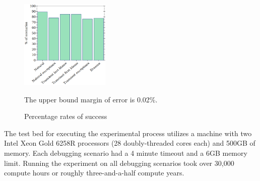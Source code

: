 
\begin{figure} \footnotesize
  \vspace{-1.5em}
  \includegraphics[width=0.38\textwidth]{./plots/success-bars}
  \vspace{1em}
  \begin{minipage}{0.35\textwidth} \raggedright
   The upper bound margin of error is 0.02\%.
  \end{minipage}
\vspace{-2em}
  \caption{Percentage rates of success} \label{fig:success-bars}
\end{figure}


The test bed for executing the experimental process utilizes a machine with two
Intel Xeon Gold 6258R processors (28 doubly-threaded cores each) and 500GB of
memory.  Each debugging scenario had a 4 minute timeout and a 6GB memory
limit. Running the experiment on all debugging scenarios took over
30,000 compute hours or roughly three-and-a-half compute years.

